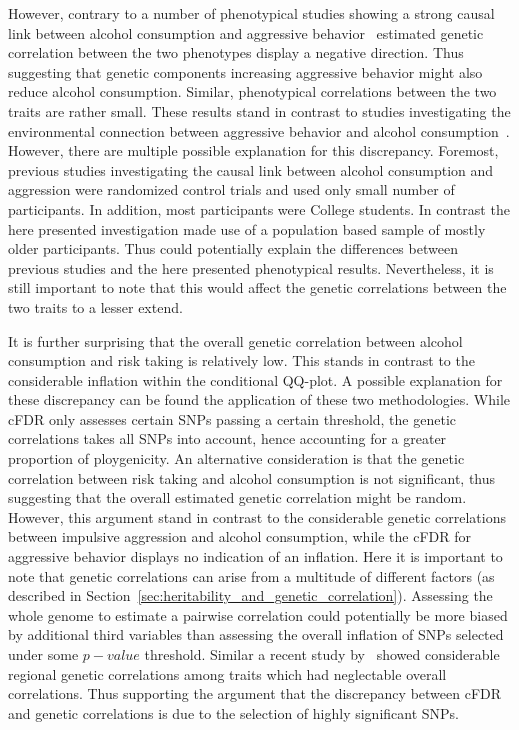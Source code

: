 However, contrary to a number of phenotypical studies showing a strong causal link between alcohol consumption and aggressive behavior~\cite{FRANZKOWIAX1987,Zuckerman2000,Dakwar2011} estimated genetic correlation between the two phenotypes display a negative direction.
Thus suggesting that genetic components increasing aggressive behavior might also reduce alcohol consumption.
Similar, phenotypical correlations between the two traits are rather small.
These results stand in contrast to studies investigating the environmental connection between aggressive behavior and alcohol consumption~\cite{Bushman1990}.
However, there are multiple possible explanation for this discrepancy.
Foremost, previous studies investigating the causal link between alcohol consumption and aggression were randomized control trials and used only small number of participants.
In addition, most participants were College students.
In contrast the here presented investigation made use of a population based sample of mostly older participants.
Thus could potentially explain the differences between previous studies and the here presented phenotypical results.
Nevertheless, it is still important to note that this would affect the genetic correlations between the two traits to a lesser extend.

It is further surprising that the overall genetic correlation between alcohol consumption and risk taking is relatively low.
This stands in contrast to the considerable inflation within the conditional QQ-plot.
A possible explanation for these discrepancy can be found the application of these two methodologies.
While cFDR only assesses certain SNPs passing a certain threshold, the genetic correlations takes all SNPs into account, hence accounting for a greater proportion of ploygenicity.
An alternative consideration is that the genetic correlation between risk taking and alcohol consumption is not significant, thus suggesting that the overall estimated genetic correlation might be random.
However, this argument stand in contrast to the considerable genetic correlations between impulsive aggression and alcohol consumption, while the cFDR for aggressive behavior displays no indication of an inflation.
Here it is important to note that genetic correlations can arise from a multitude of different factors (as described in Section~\ref{sec:heritability_and_genetic_correlation}).
Assessing the whole genome to estimate a pairwise correlation could potentially be more biased by additional third variables than assessing the overall inflation of SNPs selected under some $p-value$ threshold.
Similar a recent study by~\citet{Shi2016a} showed considerable regional genetic correlations among traits which had neglectable overall correlations.
Thus supporting the argument that the discrepancy between cFDR and genetic correlations is due to the selection of highly significant SNPs.

